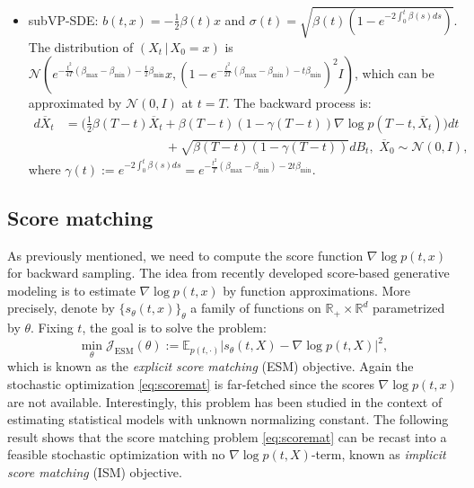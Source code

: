 \documentclass[letterpaper,11pt,reqno]{amsart}
\numberwithin{equation}{section}
\begin{document}
\begin{itemize}[itemsep = 3 pt]
\begin{equation}
\begin{aligned}
\end{aligned}
\end{equation}
\item
subVP-SDE: 
$b(t,x) = -\frac{1}{2} \beta(t)x$ and $\sigma(t) = \sqrt{\beta(t) (1 - e^{-2 \int_0^t \beta(s) ds})}$.
The distribution of $(X_t \,|\, X_0 = x)$ is
$\mathcal{N}( e^{-\frac{t^2}{4T}(\beta_{\max} - \beta_{\min}) - \frac{t}{2} \beta_{\min}}  x,  
(1 -e^{-\frac{t^2}{2T}(\beta_{\max} - \beta_{\min}) - t \beta_{\min}} )^2 I )$,
which can be approximated by $\mathcal{N}(0,I)$ at $t = T$.
The backward process is:
\begin{equation}
\label{eq:SVPrev2}
\begin{aligned}
d\overline{X}_t & = \bigg( \frac{1}{2} \beta(T-t) \overline{X}_t  + \beta(T-t)(1 - \gamma(T-t)) \nabla \log p(T-t, \overline{X}_t)\bigg)  dt \\
& \qquad \qquad \qquad \qquad + \sqrt{\beta(T-t) (1 - \gamma(T-t))} dB_t,  \,\, \overline{X}_0 \sim \mathcal{N}(0, I),
\end{aligned}
\end{equation}
where $\gamma(t):= e^{-2 \int_0^t \beta(s) ds} = e^{-\frac{t^2}{T}(\beta_{\max} - \beta_{\min}) - 2t \beta_{\min}}$.
\end{itemize}

\subsection{Score matching}
\label{sc22}

As previously mentioned, 
we need to compute the score function $\nabla \log p(t,x)$
for backward sampling. 
The idea from recently developed score-based generative modeling \cite{Ho20, Song19, Song20}
is to estimate $\nabla \log p(t,x)$ by function approximations. 
More precisely, 
denote by $\{s_\theta(t,x)\}_\theta$ a family of functions on $\mathbb{R}_+ \times \mathbb{R}^d$
parametrized by $\theta$.
Fixing $t$, the goal is to solve the problem:
\begin{equation}
\label{eq:scoremat}
\min_\theta \mathcal{J}_{\text{ESM}}(\theta):=\mathbb{E}_{p(t, \cdot)} |s_\theta(t,X) - \nabla \log p(t,X)|^2,
\end{equation}
which is known as the {\em explicit score matching} (ESM) objective. 
Again the stochastic optimization \eqref{eq:scoremat} is far-fetched
since the scores $\nabla \log p(t,x)$ are not available.  
Interestingly, this problem has been studied in the context of estimating statistical models with unknown normalizing constant.
The following result \cite{Hyv05} shows that the score matching problem \eqref{eq:scoremat}
can be recast into a feasible stochastic optimization with no $\nabla \log p(t, X)$-term,
known as {\em implicit score matching} (ISM) objective.
\end{document}
